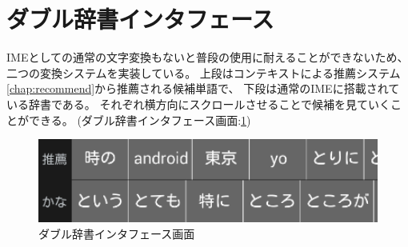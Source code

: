 \section{ダブル辞書インタフェース}
IMEとしての通常の文字変換もないと普段の使用に耐えることができないため、
二つの変換システムを実装している。
上段はコンテキストによる推薦システム\ref{chap:recommend}から推薦される候補単語で、
下段は通常のIMEに搭載されている辞書である。
それぞれ横方向にスクロールさせることで候補を見ていくことができる。
(ダブル辞書インタフェース画面:\ref{fig:doubledic})
\begin{figure}[htbp]
  \begin{center}
    \includegraphics[width=120mm,bb=0 0 387 95]{images/doubledic.png}
  \end{center}
  \label{fig:doubledic}
  \caption{ダブル辞書インタフェース画面}
\end{figure}

